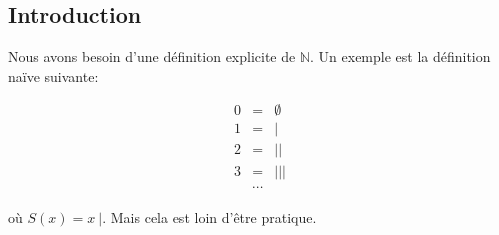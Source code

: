\subsection{Introduction}

Nous avons besoin d'une définition explicite de $\mathbb{N}$.
Un exemple est la définition naïve suivante:

\begin{eqnarray*}
    0 &=& \emptyset \\
    1 &=& |\\
    2 &=& ||\\
    3 &=& |||\\
      &\cdots&
\end{eqnarray*}

où $S(x) = x \ |$. Mais cela est loin d'être pratique.
